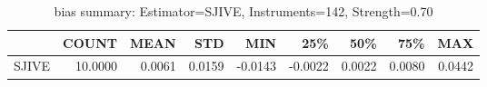 \begin{table}[ht]
\centering
\caption{bias summary: Estimator=SJIVE, Instruments=142, Strength=0.70}
\begin{tabular}{lrrrrrrrr}
\toprule
 & COUNT & MEAN & STD & MIN & 25\% & 50\% & 75\% & MAX \\
\midrule
SJIVE & 10.0000 & 0.0061 & 0.0159 & -0.0143 & -0.0022 & 0.0022 & 0.0080 & 0.0442 \\
\bottomrule
\end{tabular}
\end{table}
